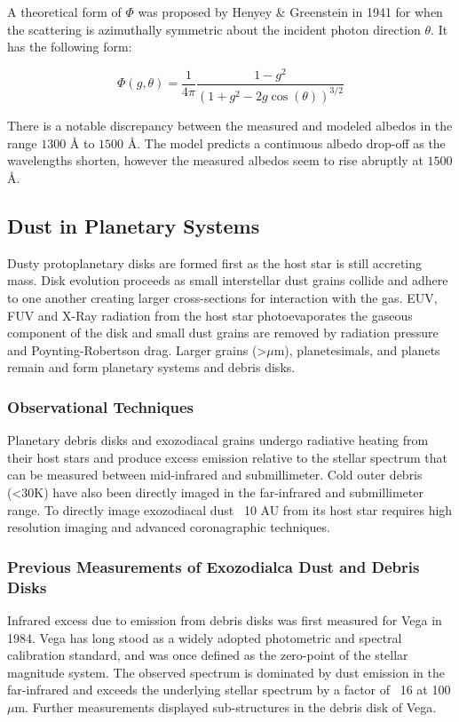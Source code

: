 \documentclass[oneside]{book}
\theoremstyle{definition}
\numberwithin{equation}{section}
\begin{document}
A theoretical form of $\Phi$ was proposed by Henyey \& Greenstein in 1941 for when the scattering is azimuthally symmetric about the incident photon direction $\theta$. It has the following form:

\begin{equation}
\Phi(g,\theta) = \frac{1}{4\pi} \frac{1-g^2}{(1+g^2-2g\cos(\theta))^{3/2}}
\end{equation}

There is a notable discrepancy between the measured and modeled albedos in the range $1300$ \r{A} to $1500$ \r{A}. The model predicts a continuous albedo drop-off as the wavelengths shorten, however the measured albedos seem to rise abruptly at $1500$ \r{A}. 

\subsection{Dust in Planetary Systems}

Dusty protoplanetary disks are formed first as the host star is still accreting mass. Disk evolution proceeds as small interstellar dust grains collide and adhere to one another creating larger cross-sections for interaction with the gas. EUV, FUV and X-Ray radiation from the host star photoevaporates the gaseous component of the disk and small dust grains are removed by radiation pressure and Poynting-Robertson drag. Larger grains (>$\mu$m), planetesimals, and planets remain and form planetary systems and debris disks. 

\subsubsection{Observational Techniques}

Planetary debris disks and exozodiacal grains undergo radiative heating from their host stars and produce excess emission relative to the stellar spectrum that can be measured between mid-infrared and submillimeter. Cold outer debris (<30K) have also been directly imaged in the far-infrared and submillimeter range. To directly image exozodiacal dust ~10 AU from its host star requires high resolution imaging and advanced coronagraphic techniques. 

\subsubsection{Previous Measurements of Exozodialca Dust and Debris Disks}

Infrared excess due to emission from debris disks was first measured for Vega in 1984. Vega has long stood as a widely adopted photometric and spectral calibration standard, and was once defined as the zero-point of the stellar magnitude system. The observed spectrum is dominated by dust emission in the far-infrared and exceeds the underlying stellar spectrum by a factor of ~16 at 100 $\mu$m. Further measurements displayed sub-structures in the debris disk of Vega. 
\end{document}
